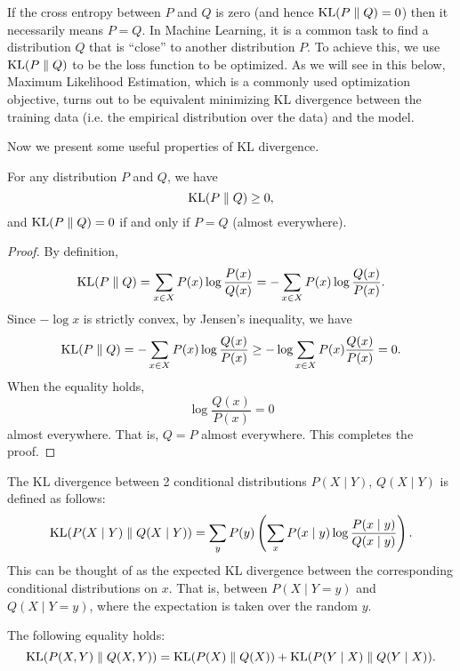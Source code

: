 \documentclass[a4paper]{article}
\begin{document}
If the cross entropy between $P$ and $Q$ is zero
(and hence $\operatorname{KL}(P \; \Vert \; Q) = 0$) then it necessarily
means $P = Q$. In Machine Learning, it is a common
task to find a distribution $Q$ that is ``close'' to
another distribution $P$. To achieve this, we use
$\operatorname{KL}(P \; \Vert \; Q)$ to be the loss function to be optimized.
As we will see in this below, Maximum Likelihood
Estimation, which is a commonly used optimization objective,
turns out to be equivalent minimizing KL divergence between
the training data (i.e. the empirical distribution over the
data) and the model.

Now we present some useful properties of KL divergence.

\begin{thm}
  For any distribution $P$ and $Q$, we have
  \[
  \operatorname{KL}(P \; \Vert \; Q) \geq 0,
  \]
  and $\operatorname{KL}(P \; \Vert \; Q) = 0$ if and only if $P = Q$ (almost
  everywhere).
\end{thm}

\begin{proof}
  By definition,
  \[
    \operatorname{KL}(P \; \Vert \; Q) = \sum_{x \in X} P(x) \log \frac{P(x)}{Q(x)} = - \sum_{x \in X} P(x) \log \frac{Q(x)}{P(x)}.
  \]
  Since $-\log x$ is strictly convex, by Jensen's inequality, we have
  \[
  \begin{aligned}
    \operatorname{KL}(P \; \Vert \; Q) = - \sum_{x \in X} P(x) \log \frac{Q(x)}{P(x)}
    \geq -\log \sum_{x \in X} P(x) \frac{Q(x)}{P(x)} = 0.
  \end{aligned}
  \]
  When the equality holds,
  \[
  \log \frac{Q(x)}{P(x)} = 0
  \]
  almost everywhere.
  That is, $Q = P$ almost everywhere.
  This completes the proof.
\end{proof}

\begin{defi}
  The KL divergence between 2 conditional distributions
  $P(X \mid Y)$, $Q(X \mid Y)$ is defined as follows:
  \[
  \operatorname{KL}({P(X \mid Y)} \; \Vert \; {Q(X \mid Y)}) = \sum_y P(y)
  \left( \sum_x P(x \mid y) \log
  \frac{P(x \mid y)}{Q(x \mid y)} \right).
  \]
  This can be thought of as the expected KL divergence
  between the corresponding conditional distributions on
  $x$. That is, between $P(X \mid Y = y)$ and $Q(X \mid Y = y)$,
  where the expectation is taken over the random $y$.
\end{defi}

\begin{thm}
The following equality holds:
\[
\operatorname{KL}({P(X, Y)} \; \Vert \; {Q(X, Y)}) =
\operatorname{KL}({P(X)} \; \Vert \; {Q(X)}) + \operatorname{KL}({P(Y \mid X)}
\; \Vert \; {Q(Y \mid X)}).
\]
\end{thm}
\end{document}

